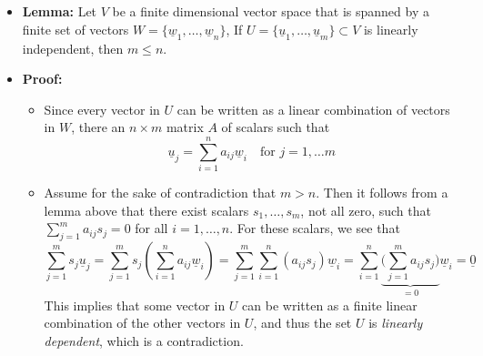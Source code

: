 \documentclass[11pt,twoside]{report}
\newcommand{\vecnot}{\underline}
\newcommand{\Span}{\mathrm{span}}
\begin{document}
\begin{itemize}
\item \textbf{Lemma:} Let $V$ be a finite dimensional vector space that is spanned by a finite set of vectors  $W = \{ \vecnot{w}_1, \dots , \vecnot{w}_n\}$, 
If $U= \{\vecnot{u}_1, \dots, \vecnot{u}_m\} \subset V$ is linearly independent, then $m \le n$. 


\item \textbf{Proof:} 

\begin{itemize}
\item Since every vector in $U$ can be written as a linear combination of vectors in $W$, there an $n \times m$ matrix $A$  of scalars such that 
\[
\vecnot{u}_j = \sum_{i=1}^n a_{ij} \vecnot{w}_i \quad \text{for $j = 1, \dots m$} 
\]
\item  Assume for the sake of contradiction that $m > n$. Then it follows from a lemma above that  there exist scalars $s_1, \dots, s_m$,  not all zero,  such that $\sum_{j=1}^m   a_{ij}  s_j  = 0$ for all $i = 1, \dots, n$.  For these scalars, we see that
\[
\sum_{j=1}^m s_j \vecnot{u}_j = \sum_{j=1}^m  s_j  \left(  \sum_{i=1}^n  a_{ij} \vecnot{w}_i \right) = \sum_{j=1}^m    \sum_{i=1}^n  ( a_{ij}  s_j)   \vecnot{w}_i  =\sum_{i=1}^n  \underbrace{ \bigg(  \sum_{j=1}^m   a_{ij}  s_j  \bigg) }_{ = 0} \vecnot{w}_i   = \vecnot{0} 
\]
 This implies that some vector in $U$ can be written as a finite linear combination of the other vectors in $U$, and thus the set $U$ is \emph{linearly dependent}, which is a contradiction. 

\end{itemize}






\end{itemize}
\end{document}
